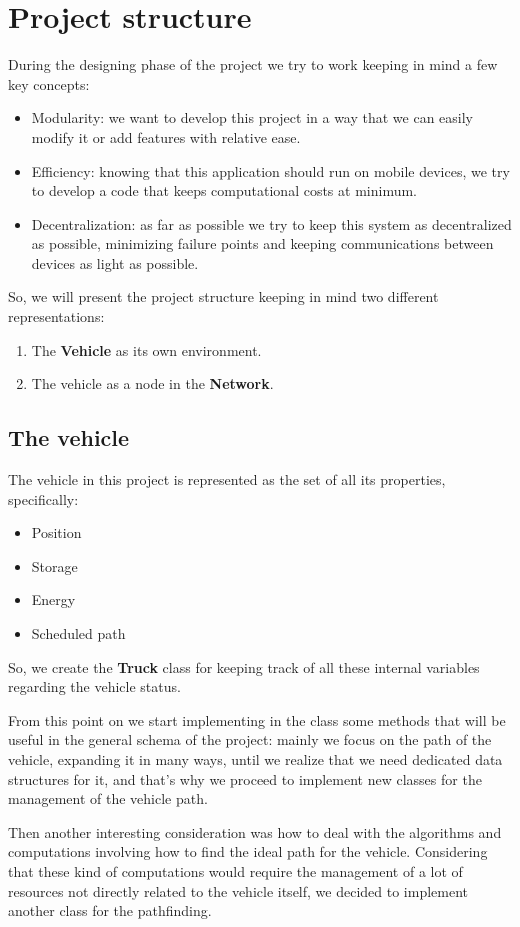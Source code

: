 \documentclass[titlepage]{article}
\begin{document}
\section{Project structure}
During the designing phase of the project we try to work keeping in mind a few key concepts:
\begin{itemize}
    \item Modularity: we want to develop this project in a way that we can easily modify it or add features with relative ease.
    \item Efficiency: knowing that this application should run on mobile devices, we try to develop a code that keeps computational costs at minimum.
    \item Decentralization: as far as possible we try to keep this system as decentralized as possible, minimizing failure points and keeping communications between devices as light as possible.
\end{itemize}
So, we will present the project structure keeping in mind two different representations:
\begin{enumerate}
    \item The \textbf{Vehicle} as its own environment.
    \item The vehicle as a node in the \textbf{Network}.
\end{enumerate}
\subsection{The vehicle}
The vehicle in this project is represented as the set of all its properties, specifically:
\begin{itemize}
    \item Position
    \item Storage
    \item Energy
    \item Scheduled path
\end{itemize}

So, we create the \textbf{Truck} class for keeping track of all these internal variables regarding the vehicle status.

From this point on we start implementing in the class some methods that will be useful in the general schema of the project: mainly we focus on the path of the vehicle, expanding it in many ways, until we realize that we need dedicated data structures for it, and that's why we proceed to implement new classes for the management of the vehicle path.

Then another interesting consideration was how to deal with the algorithms and computations involving how to find the ideal path for the vehicle. Considering that these kind of computations would require the management of a lot of resources not directly related to the vehicle itself, we decided to implement another class for the pathfinding.
\end{document}
